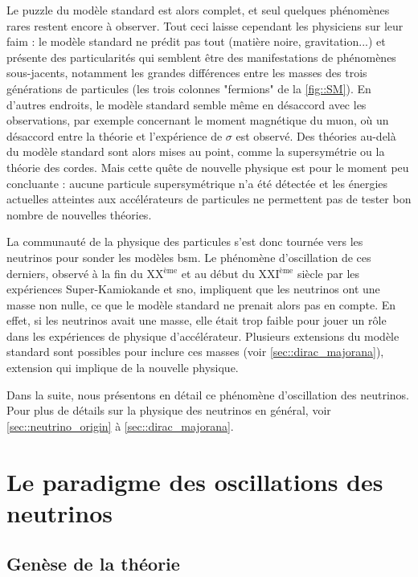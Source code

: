       Le puzzle du modèle standard est alors complet, et seul quelques phénomènes rares restent encore à observer. Tout ceci laisse cependant les physiciens sur leur faim : le modèle standard ne prédit pas tout (matière noire, gravitation...) et présente des particularités qui semblent être des manifestations de phénomènes sous-jacents, notamment les grandes différences entre les masses des trois générations de particules (les trois colonnes "fermions" de la \autoref{fig::SM}). En d'autres endroits, le modèle standard semble même en désaccord avec les observations, par exemple concernant le moment magnétique du muon, où un désaccord entre la théorie et l'expérience de $\sigma$ est observé\cite{pdg2018}. Des théories au-delà du modèle standard sont alors mises au point, comme la supersymétrie ou la théorie des cordes\cite{pdg2018}. Mais cette quête de nouvelle physique est pour le moment peu concluante : aucune particule supersymétrique n'a été détectée et les énergies actuelles atteintes aux accélérateurs de particules ne permettent pas de tester bon nombre de nouvelles théories.

      La communauté de la physique des particules s'est donc tournée vers les neutrinos pour sonder les modèles \gls{bsm}. Le phénomène d'oscillation de ces derniers, observé à la fin du XX$^{\text{ème}}$ et au début du XXI$^{\text{ème}}$ siècle par les expériences Super-Kamiokande\cite{Fukuda1998} et \gls{sno}\cite{Aharmim2013}, impliquent que les neutrinos ont une masse non nulle, ce que le modèle standard ne prenait alors pas en compte. En effet, si les neutrinos avait une masse, elle était trop faible pour jouer un rôle dans les expériences de physique d'accélérateur.  Plusieurs extensions du modèle standard sont possibles pour inclure ces masses (voir \autoref{sec::dirac_majorana}), extension qui implique de la nouvelle physique.

      Dans la suite, nous présentons en détail ce phénomène d'oscillation des neutrinos. Pour plus de détails sur la physique des neutrinos en général, voir \autoref{sec::neutrino_origin} à \autoref{sec::dirac_majorana}.

  \section{Le paradigme des oscillations des neutrinos}

    \subsection{Genèse de la théorie}

